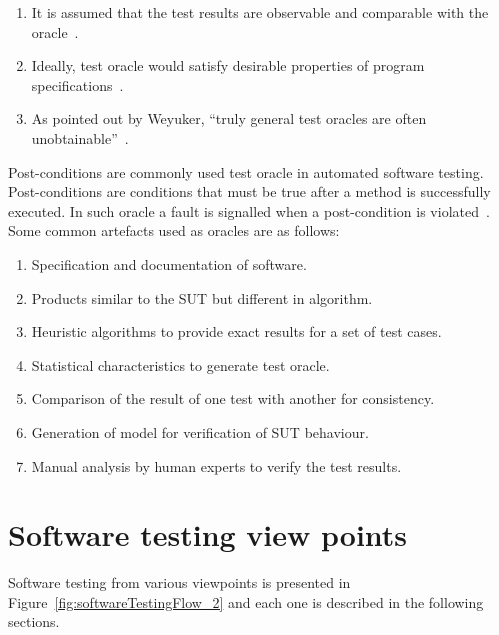 \begin{enumerate}
\item It is assumed that the test results are observable and comparable with the oracle~\cite{weyuker1982testing}.
\item Ideally, test oracle would satisfy desirable properties of program specifications~\cite{baresi2001test}.
\item As pointed out by Weyuker, ``truly general test oracles are often unobtainable''~\cite{weyuker1982testing}. 
\end{enumerate}
\bigskip
Post-conditions are commonly used test oracle in automated software testing. Post-conditions are conditions that must be true after a method is successfully executed. In such oracle a fault is signalled when a post-condition is violated~\cite{meyer2009programs}. 
Some common artefacts used as oracles are as follows:

\begin{enumerate}
\item Specification and documentation of software.
\item Products similar to the SUT but different in algorithm. %
\item Heuristic algorithms to provide exact results for a set of test cases. %
\item Statistical characteristics to generate test oracle. %
\item Comparison of the result of one test with another for consistency. %
\item Generation of model for verification of SUT behaviour. %
\item Manual analysis by human experts to verify the test results. %
\end{enumerate}

\section{Software testing view points}
Software testing from various viewpoints is presented in Figure~\ref{fig:softwareTestingFlow_2} and each one is described in the following sections.

